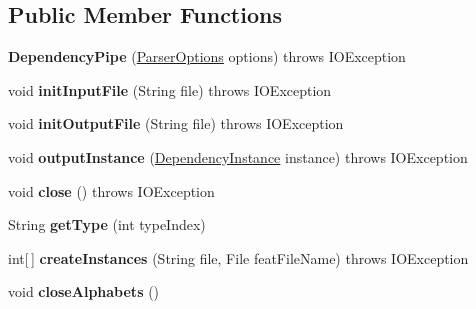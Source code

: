 \subsection*{Public Member Functions}
\begin{DoxyCompactItemize}
\item 
\hypertarget{classmstparser_1_1DependencyPipe_a28ba5b8395eddec30cc34b43aad932f9}{
{\bfseries DependencyPipe} (\hyperlink{classmstparser_1_1ParserOptions}{ParserOptions} options)  throws IOException }
\label{classmstparser_1_1DependencyPipe_a28ba5b8395eddec30cc34b43aad932f9}

\item 
\hypertarget{classmstparser_1_1DependencyPipe_a58692be62a7785bb29ca3631cdf06624}{
void {\bfseries initInputFile} (String file)  throws IOException }
\label{classmstparser_1_1DependencyPipe_a58692be62a7785bb29ca3631cdf06624}

\item 
\hypertarget{classmstparser_1_1DependencyPipe_a060afb11ca904f44d41be9fe49ac413f}{
void {\bfseries initOutputFile} (String file)  throws IOException }
\label{classmstparser_1_1DependencyPipe_a060afb11ca904f44d41be9fe49ac413f}

\item 
\hypertarget{classmstparser_1_1DependencyPipe_aea500939460ea83a22e8c2243563f344}{
void {\bfseries outputInstance} (\hyperlink{classmstparser_1_1DependencyInstance}{DependencyInstance} instance)  throws IOException }
\label{classmstparser_1_1DependencyPipe_aea500939460ea83a22e8c2243563f344}

\item 
\hypertarget{classmstparser_1_1DependencyPipe_a2d5e277a752411ee3324b78d0e2f0bbe}{
void {\bfseries close} ()  throws IOException }
\label{classmstparser_1_1DependencyPipe_a2d5e277a752411ee3324b78d0e2f0bbe}

\item 
\hypertarget{classmstparser_1_1DependencyPipe_abfa0b78511e83ccd5c0b595001e479a2}{
String {\bfseries getType} (int typeIndex)}
\label{classmstparser_1_1DependencyPipe_abfa0b78511e83ccd5c0b595001e479a2}

\item 
\hypertarget{classmstparser_1_1DependencyPipe_a5c5902b10053c33e97a543aefd8a0552}{
int\mbox{[}$\,$\mbox{]} {\bfseries createInstances} (String file, File featFileName)  throws IOException }
\label{classmstparser_1_1DependencyPipe_a5c5902b10053c33e97a543aefd8a0552}

\item 
\hypertarget{classmstparser_1_1DependencyPipe_a1af583e13d04883d762ef7dd7c5b89dc}{
void {\bfseries closeAlphabets} ()}
\label{classmstparser_1_1DependencyPipe_a1af583e13d04883d762ef7dd7c5b89dc}


\end{DoxyCompactItemize}
